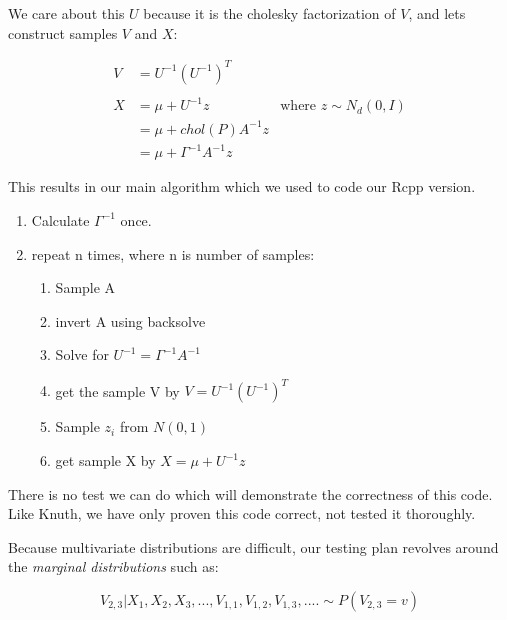 \documentclass[english]{report}
\begin{document}
We care about this $U$ because it is the cholesky factorization of $V$, and lets construct samples $V$ and $X$:

\begin{align*}
V & =U^{-1}\left(U^{-1}\right)^{T}\\
\\
X & =\mu+U^{-1}z & \text{where }z\sim N_{d}(0,I)\\
 & =\mu+chol(P)A^{-1}z\\
 & =\mu+\Gamma^{-1}A^{-1}z
\end{align*}

This results in our main algorithm which we used to code our Rcpp version.

\begin{enumerate}
\item Calculate $\Gamma^{-1}$ once.
\item repeat n times, where n is number of samples:
\begin{enumerate}
		\item Sample A
		\item invert A using backsolve
		\item Solve for $U^{-1} = \Gamma^{-1}A^{-1}$\\
		\item get the sample V by $V = U^{-1}\left(U^{-1}\right)^{T}$\\
		\item Sample $z_i$ from $N(0,1)$ \\
		\item get sample X by $X = \mu+U^{-1}z$
\end{enumerate}

\end{enumerate}




There is no test we can do which will demonstrate the correctness of this code.
Like Knuth, we have only proven this code correct, not tested it thoroughly.

Because multivariate distributions are difficult, our testing plan revolves around the \emph{marginal distributions} such as:

$$ V_{2,3} | X_1, X_2, X_3, ..., V_{1,1}, V_{1,2}, V_{1,3} , ....  \sim P(V_{2,3} = v) $$
\end{document}
